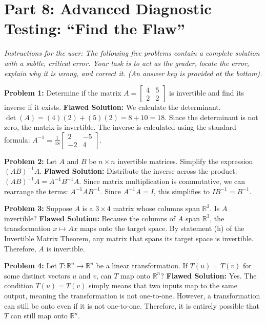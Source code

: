 \documentclass[11pt]{article}
\begin{document}
\section*{Part 8: Advanced Diagnostic Testing: ``Find the Flaw''}
\textit{Instructions for the user: The following five problems contain a complete solution with a subtle, critical error. Your task is to act as the grader, locate the error, explain why it is wrong, and correct it. (An answer key is provided at the bottom).}

\textbf{Problem 1:} Determine if the matrix $A = \begin{bmatrix} 4 & 5 \\ 2 & 2 \end{bmatrix}$ is invertible and find its inverse if it exists.
\newline
\textbf{Flawed Solution:} 
We calculate the determinant. $\det(A) = (4)(2) + (5)(2) = 8 + 10 = 18$. Since the determinant is not zero, the matrix is invertible.
The inverse is calculated using the standard formula:
$A^{-1} = \frac{1}{18}\begin{bmatrix} 2 & -5 \\ -2 & 4 \end{bmatrix}$.

\vspace{0.5cm}
\textbf{Problem 2:} Let $A$ and $B$ be $n \times n$ invertible matrices. Simplify the expression $(A B)^{-1} A$.
\newline
\textbf{Flawed Solution:} 
Distribute the inverse across the product: $(A B)^{-1} A = A^{-1} B^{-1} A$.
Since matrix multiplication is commutative, we can rearrange the terms: $A^{-1} A B^{-1}$.
Since $A^{-1} A = I$, this simplifies to $I B^{-1} = B^{-1}$.

\vspace{0.5cm}
\textbf{Problem 3:} Suppose $A$ is a $3 \times 4$ matrix whose columns span $\mathbb{R}^3$. Is $A$ invertible?
\newline
\textbf{Flawed Solution:} 
Because the columns of $A$ span $\mathbb{R}^3$, the transformation $x \mapsto Ax$ maps onto the target space. By statement (h) of the Invertible Matrix Theorem, any matrix that spans its target space is invertible. Therefore, $A$ is invertible.

\vspace{0.5cm}
\textbf{Problem 4:} Let $T: \mathbb{R}^n \to \mathbb{R}^n$ be a linear transformation. If $T(u) = T(v)$ for some distinct vectors $u$ and $v$, can $T$ map onto $\mathbb{R}^n$?
\newline
\textbf{Flawed Solution:} 
Yes. The condition $T(u) = T(v)$ simply means that two inputs map to the same output, meaning the transformation is not one-to-one. However, a transformation can still be onto even if it is not one-to-one. Therefore, it is entirely possible that $T$ can still map onto $\mathbb{R}^n$.
\end{document}
